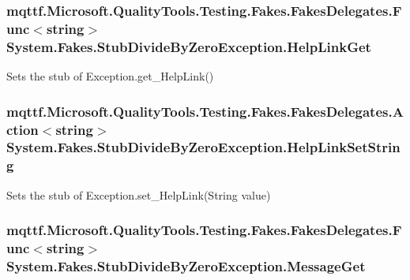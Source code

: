 \hypertarget{class_system_1_1_fakes_1_1_stub_divide_by_zero_exception_aea2d8d38af1f54526436d438af684f14}{
\subsubsection[{Help\-Link\-Get}]{\setlength{\rightskip}{0pt plus 5cm}mqttf.\-Microsoft.\-Quality\-Tools.\-Testing.\-Fakes.\-Fakes\-Delegates.\-Func$<$string$>$ System.\-Fakes.\-Stub\-Divide\-By\-Zero\-Exception.\-Help\-Link\-Get}}\label{class_system_1_1_fakes_1_1_stub_divide_by_zero_exception_aea2d8d38af1f54526436d438af684f14}


Sets the stub of Exception.\-get\-\_\-\-Help\-Link()

\hypertarget{class_system_1_1_fakes_1_1_stub_divide_by_zero_exception_a54aa2cf039f43ac28b1e2119d09d1515}{
\subsubsection[{Help\-Link\-Set\-String}]{\setlength{\rightskip}{0pt plus 5cm}mqttf.\-Microsoft.\-Quality\-Tools.\-Testing.\-Fakes.\-Fakes\-Delegates.\-Action$<$string$>$ System.\-Fakes.\-Stub\-Divide\-By\-Zero\-Exception.\-Help\-Link\-Set\-String}}\label{class_system_1_1_fakes_1_1_stub_divide_by_zero_exception_a54aa2cf039f43ac28b1e2119d09d1515}


Sets the stub of Exception.\-set\-\_\-\-Help\-Link(\-String value)

\hypertarget{class_system_1_1_fakes_1_1_stub_divide_by_zero_exception_a6d271caf3c1219d4dbd9c0b7f497f367}{
\subsubsection[{Message\-Get}]{\setlength{\rightskip}{0pt plus 5cm}mqttf.\-Microsoft.\-Quality\-Tools.\-Testing.\-Fakes.\-Fakes\-Delegates.\-Func$<$string$>$ System.\-Fakes.\-Stub\-Divide\-By\-Zero\-Exception.\-Message\-Get}}\label{class_system_1_1_fakes_1_1_stub_divide_by_zero_exception_a6d271caf3c1219d4dbd9c0b7f497f367}


